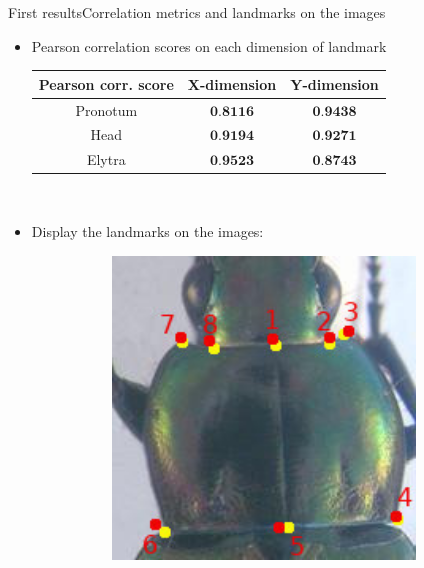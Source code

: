 \documentclass[10pt,svgnames]{beamer}
\begin{document}
\begin{frame}{First results}{Correlation metrics and landmarks on the images}
	\begin{itemize}
		\item Pearson correlation scores on each dimension of landmark
			\begin{table}[htbp]
				\centering
				\begin{tabular}{|c|c|c|}
					\hline
					Pearson corr. score & X-dimension & Y-dimension \\ \hline
					Pronotum & $\textbf{0.8116}$ & $\textbf{0.9438}$ \\ \hline
					Head & $\textbf{0.9194}$ & $\textbf{0.9271}$ \\ \hline
					Elytra & $\textbf{0.9523}$ & $\textbf{0.8743}$ \\ \hline
				\end{tabular}
			\end{table}~\\
	\item Display the landmarks on the images:
	\begin{figure}[htbp]
   				\begin{subfigure}[t]{0.3\textwidth}
        			\centering
        			\includegraphics[width=0.95\textwidth]{images/Prono_001_fs}
        			\caption*{}
        			\label{figsub11}
    			\end{subfigure}%
    			~ 

\end{figure}
\end{itemize}
\end{frame}
\end{document}
